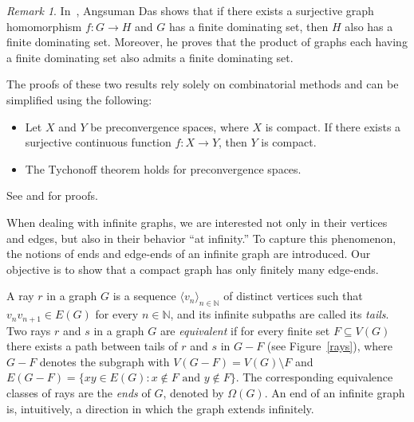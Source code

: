 \documentclass{amsart}
\theoremstyle{definition}
\theoremstyle{remark}
\newtheorem{remark}{Remark}[section]
\numberwithin{equation}{section}
\begin{document}
\begin{remark}
In~\cite[Theorems 5.1 and 5.3]{Das2017}, Angsuman Das shows that if there exists a surjective graph homomorphism $f : G \to H$ and $G$ has a finite dominating set, then $H$ also has a finite dominating set. Moreover, he proves that the product of graphs each having a finite dominating set also admits a finite dominating set.

The proofs of these two results rely solely on combinatorial methods and can be simplified using the following:

\begin{itemize}
	\item Let $X$ and $Y$ be preconvergence spaces, where $X$ is compact. If there exists a surjective continuous function $f:X\to Y$, then $Y$ is compact. 
	\item The Tychonoff theorem holds for preconvergence spaces.
\end{itemize}
See \cite{BB} and \cite{dol} for proofs.

\end{remark}

When dealing with infinite graphs, we are interested not only in their vertices and edges, but also in their behavior ``at infinity.'' To capture this phenomenon, the notions of ends and edge-ends of an infinite graph are introduced. Our objective is to show that a compact graph has only finitely many edge-ends.

A ray $r$ in a graph $G$ is a sequence $\langle v_n\rangle_{n\in\mathbb{N}}$ of distinct vertices such that $v_nv_{n+1}\in E(G)$ for every $n\in\mathbb{N}$, and its infinite subpaths are called its \emph{tails}. Two rays $r$ and $s$ in a graph $G$ are \emph{equivalent} if for every finite set $F\subseteq V(G)$ there exists a path between tails of $r$ and $s$ in $G-F$ (see Figure~\ref{rays}), where $G-F$ denotes the subgraph with $V(G-F)=V(G)\setminus F$ and $E(G-F)=\{xy\in E(G): x\notin F \text{ and } y\notin F\}$. The corresponding equivalence classes of rays are the \emph{ends} of $G$, denoted by $\Omega(G)$. An end of an infinite graph is, intuitively, a direction in which the graph extends infinitely.
\end{document}
